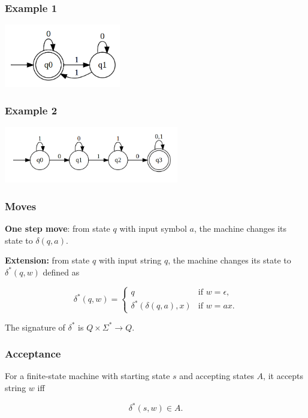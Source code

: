 \begin{frame}
  \frametitle{Example 1}

  \includegraphics[width=2in]{images/gv/mc02-fa-ex1.png}
\end{frame}

\begin{frame}
  \frametitle{Example 2}

  \includegraphics[width=3in]{images/gv/mc02-fa-ex2.png}
\end{frame}

\begin{frame}
  \frametitle{Moves}

  {\bf One step move}: from state $q$ with input symbol $a$, the
  machine changes its state to \pause $\delta(q,a)$.

  {\bf Extension:} from state $q$ with input string $q$, the machine
  changes its state to $\delta^*(q,w)$ defined as

  \pause

  \begin{block}{}
  \[
  \delta^*(q,w) = \left\{
  \begin{array}{ll}
    q & \mbox{if $w=\epsilon$,} \\
    \delta^*(\delta(q,a),x) & \mbox{if $w=ax$.}
  \end{array}
  \right.
  \]
  \end{block}
  
  The signature of $\delta^*$ is $Q\times\Sigma^* \longrightarrow Q$.
\end{frame}

\begin{frame}
  \frametitle{Acceptance}

  For a finite-state machine with starting state $s$ and accepting
  states $A$, it accepts string $w$ iff

  \pause

  \[
  \delta^*(s,w)\in A.
  \]
  
\end{frame}

